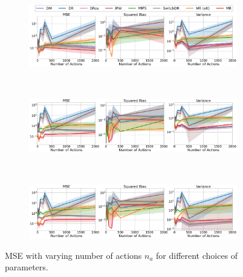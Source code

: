 \begin{figure}[h!]
    \centering
	\begin{subfigure}{0.8\textwidth}
	    \centering
	    \includegraphics[width=1\textwidth]{figures/mr/mips_experiments/ope_vs_nac_dimc_1000_alphatar_0_4_neval_100_ntrain_100000.png}
	    \label{subfig:d-1000-neval-100-alphatar-0-4-nac-mips}
	\end{subfigure}\\
	\begin{subfigure}{0.8\textwidth} 
	    \centering
	    \includegraphics[width=1\textwidth]{figures/mr/mips_experiments/ope_vs_nac_dimc_1000_alphatar_0_8_neval_100_ntrain_100000.png}
	    \label{subfig:d-1000-neval-100-alphatar-0-8-nac-mips}
	\end{subfigure}\\
	\begin{subfigure}{0.8\textwidth} 
	    \centering
	    \includegraphics[width=1\textwidth]{figures/mr/mips_experiments/ope_vs_nac_dimc_1000_alphatar_1_0_neval_100_ntrain_100000.png}
	    \label{subfig:d-1000-neval-100-alphatar-1-0-nac-mips}
	\end{subfigure}
    \caption{MSE with varying number of actions $n_a$ for different choices of parameters.}
    \label{fig:mse-vs-nac-mips}
\end{figure}

